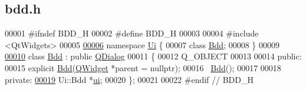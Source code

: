 \hypertarget{bdd_8h_source}{}\subsection{bdd.\+h}

\begin{DoxyCode}
00001 \textcolor{preprocessor}{#ifndef BDD\_H}
00002 \textcolor{preprocessor}{#define BDD\_H}
00003 
00004 \textcolor{preprocessor}{#include <QtWidgets>}
00005 
\hyperlink{namespace_ui}{00006} \textcolor{keyword}{namespace }\hyperlink{namespace_ui}{Ui} \{
00007 \textcolor{keyword}{class }\hyperlink{class_bdd}{Bdd};
00008 \}
00009 
\hyperlink{class_bdd}{00010} \textcolor{keyword}{class }\hyperlink{class_bdd}{Bdd} : \textcolor{keyword}{public} \hyperlink{class_q_dialog}{QDialog}
00011 \{
00012     Q\_OBJECT
00013 
00014 \textcolor{keyword}{public}:
00015     \textcolor{keyword}{explicit} \hyperlink{class_bdd}{Bdd}(\hyperlink{class_q_widget}{QWidget} *parent = \textcolor{keyword}{nullptr});
00016     ~\hyperlink{class_bdd}{Bdd}();
00017 
00018 \textcolor{keyword}{private}:
\hyperlink{class_bdd_a7d9f43a44caaddb2f5ccd728ecc78c2a}{00019}     Ui::Bdd *\hyperlink{class_bdd_a7d9f43a44caaddb2f5ccd728ecc78c2a}{ui};
00020 \};
00021 
00022 \textcolor{preprocessor}{#endif // BDD\_H}
\end{DoxyCode}
